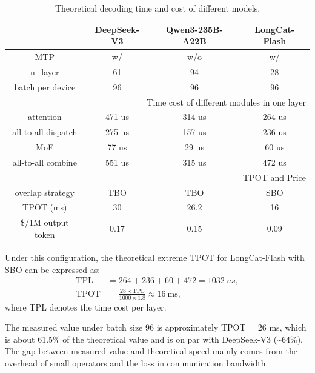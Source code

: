 \documentclass{article}
\newcommand{\longcat}{LongCat-Flash\xspace}
\begin{document}
\begin{table}[h]
    \caption{Theoretical decoding time and cost of different models.}
    \centering
    
    \begin{tabular}{cccc}
        \toprule
          & DeepSeek-V3 & Qwen3-235B-A22B & \longcat \\
         \midrule
         MTP & w/ & w/o & w/ \\
         n\_layer            & 61  & 94  & 28 \\
         batch per device & 96 & 96 & 96 \\
         \midrule
         \multicolumn{4}{r}{Time cost of different modules in one layer} \\
         \midrule
         attention          & 471 us & 314 us & 264 us \\
         all-to-all dispatch & 275 us & 157 us  & 236 us \\
         MoE                 & 77 us  & 29 us  & 60 us \\
         all-to-all combine  & 551 us & 315 us & 472 us \\
         \midrule
         \multicolumn{4}{r}{TPOT and Price}\\
         \midrule
         overlap strategy    & TBO & TBO & SBO \\
         TPOT (ms)           & 30  & 26.2  & 16 \\
         \$/1M output token & 0.17 & 0.15 & 0.09 \\
         \bottomrule
    \end{tabular}
    \label{table:per_layer_time}
\end{table}

Under this configuration, the theoretical extreme TPOT for \longcat with SBO can be expressed as:
\[
\begin{aligned}
    \mathrm{TPL}  &= 264 + 236 + 60 + 472 = 1032 ~us, \\[0.6ex]
    \mathrm{TPOT} &= \frac{28 \times \mathrm{TPL}}{1000 \times 1.8} \approx 16~\mathrm{ms},
\end{aligned}
\]
where $\mathrm{TPL}$ denotes the time cost per layer.  

The measured value under batch size 96 is approximately TPOT = 26 ms, which is about 61.5\% of the theoretical value and is on par with DeepSeek-V3 (\textasciitilde 64\%). The gap between measured value and theoretical speed mainly comes from the overhead of small operators and the loss in communication bandwidth.
\end{document}
